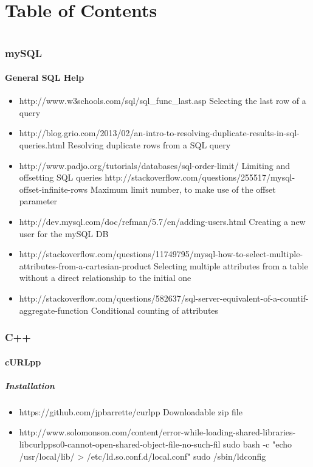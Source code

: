 \documentclass[12pt]{article}
\begin{document}
\part*{Table of Contents}
\tableofcontents
\pagebreak
\part*{}
\section{mySQL}
	\subsection{General SQL Help}
		\begin{itemize}
			\item http://www.w3schools.com/sql/sql\_func\_last.asp
			\subitem Selecting the last row of a query
			\item http://blog.grio.com/2013/02/an-intro-to-resolving-duplicate-results-in-sql-queries.html
			\subitem Resolving duplicate rows from a SQL query
			\item http://www.padjo.org/tutorials/databases/sql-order-limit/
			\subitem Limiting and offsetting SQL queries
			\subitem http://stackoverflow.com/questions/255517/mysql-offset-infinite-rows
			\subsubitem Maximum limit number, to make use of the offset parameter
			\item http://dev.mysql.com/doc/refman/5.7/en/adding-users.html
			\subitem Creating a new user for the mySQL DB
			\item http://stackoverflow.com/questions/11749795/mysql-how-to-select-multiple-attributes-from-a-cartesian-product
			\subitem Selecting multiple attributes from a table without a direct relationship to the initial one
			\item http://stackoverflow.com/questions/582637/sql-server-equivalent-of-a-countif-aggregate-function
			\subitem Conditional counting of attributes
		\end{itemize}
\section{C++}
	\subsection{cURLpp}
	\subsubsection{Installation}
	\begin{itemize}
		\item https://github.com/jpbarrette/curlpp
		\subitem Downloadable zip file
		\item http://www.solomonson.com/content/error-while-loading-shared-libraries-libcurlppso0-cannot-open-shared-object-file-no-such-fil
		\subitem sudo bash -c "echo /usr/local/lib/ > /etc/ld.so.conf.d/local.conf"
		\subitem sudo /sbin/ldconfig
		\end{itemize}
\end{document}
